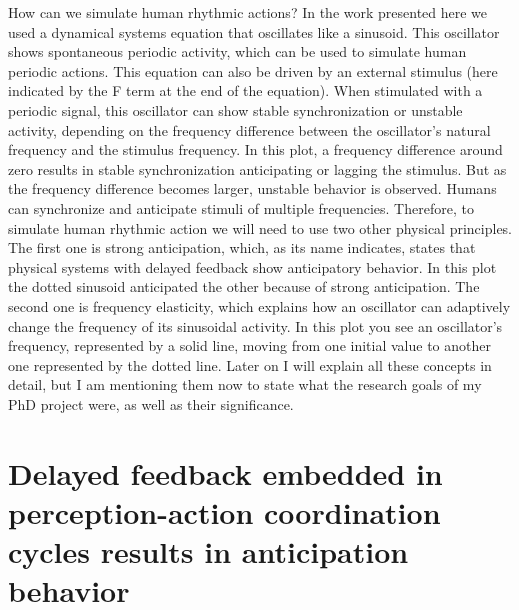 \documentclass{report}
\begin{document}
How can we simulate human rhythmic actions? In the work presented here we used a dynamical systems equation that oscillates like a sinusoid. This oscillator shows spontaneous periodic activity, which can be used to simulate human periodic actions. This equation can also be driven by an external stimulus (here indicated by the F term at the end of the equation). When stimulated with a periodic signal, this oscillator can show stable synchronization or unstable activity, depending on the frequency difference between the oscillator’s natural frequency and the stimulus frequency. In this plot, a frequency difference around zero results in stable synchronization anticipating or lagging the stimulus. But as the frequency difference becomes larger, unstable behavior is observed. Humans can synchronize and anticipate stimuli of multiple frequencies. Therefore, to simulate human rhythmic action we will need to use two other physical principles. The first one is strong anticipation, which, as its name indicates, states that physical systems with delayed feedback show anticipatory behavior. In this plot the dotted sinusoid anticipated the other because of strong anticipation. The second one is frequency elasticity, which explains how an oscillator can adaptively change the frequency of its sinusoidal activity. In this plot you see an oscillator’s frequency, represented by a solid line, moving from one initial value to another one represented by the dotted line. Later on I will explain all these concepts in detail, but I am mentioning them now to state what the research goals of my PhD project were, as well as their significance. 

\chapter{Delayed feedback embedded in perception-action coordination cycles results in anticipation behavior}
\end{document}
